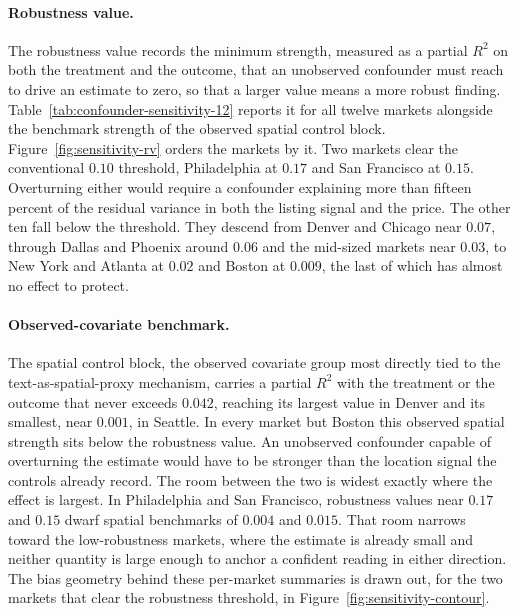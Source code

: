 \paragraph{Robustness value.} The robustness value records the minimum strength,
measured as a partial $R^2$ on both the treatment and the outcome, that an
unobserved confounder must reach to drive an estimate to zero, so that a larger
value means a more robust finding. Table~\ref{tab:confounder-sensitivity-12} reports it for all twelve markets alongside the benchmark strength of the observed spatial control block. Figure~\ref{fig:sensitivity-rv} orders the markets by it.
Two markets clear the conventional $0.10$ threshold, Philadelphia at $0.17$ and San Francisco at $0.15$. Overturning either would require a confounder explaining more than fifteen percent of the residual variance in both the listing signal and the price. The other ten fall below the threshold. They descend from Denver and Chicago near $0.07$, through Dallas and Phoenix around $0.06$ and the mid-sized markets near $0.03$, to New York and Atlanta at $0.02$ and Boston at $0.009$, the last of which has almost no effect to protect.

\paragraph{Observed-covariate benchmark.} The spatial control block, the observed
covariate group most directly tied to the text-as-spatial-proxy mechanism, carries a
partial $R^2$ with the treatment or the outcome that never exceeds $0.042$, reaching
its largest value in Denver and its smallest, near $0.001$, in Seattle. In every market but Boston this observed spatial strength sits below the robustness value. An unobserved confounder capable of overturning the estimate would have to be stronger than the location signal the controls already record. The room between the two is widest exactly where the effect is largest. In Philadelphia and San Francisco, robustness values near $0.17$ and $0.15$ dwarf spatial benchmarks of $0.004$ and $0.015$. That room narrows toward the low-robustness markets, where the estimate is already small and neither quantity is large enough to anchor a confident reading in either direction. The bias geometry behind these per-market summaries is drawn out, for the
two markets that clear the robustness threshold, in
Figure~\ref{fig:sensitivity-contour}.

